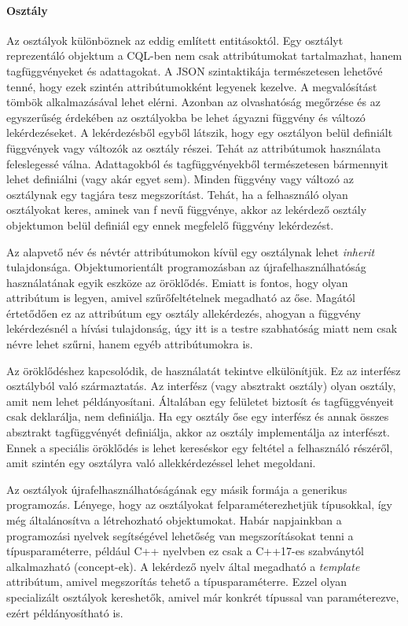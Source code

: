 \documentclass[a4paper,12pt]{report}
\begin{document}
\paragraph{Osztály}
Az osztályok különböznek az eddig említett entitásoktól. Egy osztályt reprezentáló objektum a CQL-ben nem csak attribútumokat tartalmazhat, hanem tagfüggvényeket és adattagokat. A JSON szintaktikája természetesen lehetővé tenné, hogy ezek szintén attribútumokként legyenek kezelve. A megvalósítást tömbök alkalmazásával lehet elérni. Azonban az olvashatóság megőrzése és az egyszerűség érdekében az osztályokba be lehet ágyazni függvény és változó lekérdezéseket. A lekérdezésből egyből látszik, hogy egy osztályon belül definiált függvények vagy változók az osztály részei. Tehát az attribútumok használata feleslegessé válna. Adattagokból és tagfüggvényekből természetesen bármennyit lehet definiálni (vagy akár egyet sem). Minden függvény vagy változó az osztálynak egy tagjára tesz megszorítást. Tehát, ha a felhasználó olyan osztályokat keres, aminek van f nevű függvénye, akkor az lekérdező osztály objektumon belül definiál egy ennek megfelelő függvény lekérdezést.
\par Az alapvető név és névtér attribútumokon kívül egy osztálynak lehet \textit{inherit} tulajdonsága. Objektumorientált programozásban az újrafelhasználhatóság használatának egyik eszköze az öröklődés. Emiatt is fontos, hogy olyan attribútum is legyen, amivel szűrőfeltételnek megadható az őse. Magától értetődően ez az attribútum egy osztály allekérdezés, ahogyan a függvény lekérdezésnél a hívási tulajdonság, úgy itt is a testre szabhatóság miatt nem csak névre lehet szűrni, hanem egyéb attribútumokra is.
\par Az öröklődéshez kapcsolódik, de használatát tekintve elkülönítjük. Ez az interfész osztályból való származtatás. Az interfész (vagy absztrakt osztály) olyan osztály, amit nem lehet példányosítani. Általában egy felületet biztosít és tagfüggvényeit csak deklarálja, nem definiálja. Ha egy osztály őse egy interfész és annak összes absztrakt tagfüggvényét definiálja, akkor az osztály implementálja az interfészt. Ennek a speciális öröklődés is lehet kereséskor egy feltétel a felhasználó részéről, amit szintén egy osztályra való allekkérdezéssel lehet megoldani.
\par Az osztályok újrafelhasználhatóságának egy másik formája a generikus programozás. Lényege, hogy az osztályokat felparaméterezhetjük típusokkal, így még általánosítva a létrehozható objektumokat. Habár napjainkban a programozási nyelvek segítségével lehetőség van megszorításokat tenni a típusparaméterre, például C++ nyelvben ez csak a C++17-es szabványtól alkalmazható (concept-ek). A lekérdező nyelv által megadható a \textit{template} attribútum, amivel megszorítás tehető a típusparaméterre. Ezzel olyan specializált osztályok kereshetők, amivel már konkrét típussal van paraméterezve, ezért példányosítható is.
\end{document}
